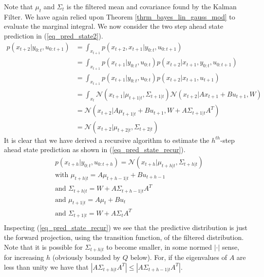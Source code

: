 Note that $\mu_t$ and $\Sigma_t$ is the filtered mean and covariance found by the Kalman Filter. We have again relied upon Theorem \ref{thrm_bayes_lin_gauss_mod} to evaluate the marginal integral. We now consider the two step ahead state prediction in (\ref{eq_pred_state2}).
\begin{equation}
\begin{aligned}
p(x_{t+2}|y_{0:t}, u_{0:t+1}) &= \int_{x_{t+1}} p(x_{t+2},x_{t+1}|y_{0:t}, u_{0:t+1}) \\
&= \int_{x_{t+1}} p(x_{t+1}|y_{0:t}, u_{0:t}) p(x_{t+2}|x_{t+1},y_{0:t}, u_{0:t+1}) \\
&= \int_{x_{t+1}} p(x_{t+1}|y_{0:t}, u_{0:t}) p(x_{t+2}|x_{t+1}, u_{t+1}) \\
&= \int_{x_t} \mathcal{N}(x_{t+1}|\mu_{t+1|t}, \Sigma_{t+1|t})\mathcal{N}(x_{t+2}|Ax_{t+1}+Bu_{t+1}, W) \\
&= \mathcal{N}(x_{t+2}|A\mu_{t+1|t}+Bu_{t+1}, W+A\Sigma_{t+1|t} A^T) \\
&= \mathcal{N}(x_{t+2}|\mu_{t+2|t}, \Sigma_{t+2|t})
\end{aligned}
\label{eq_pred_state2}
\end{equation}
It is clear that we have derived a recursive algorithm to estimate the $h^{th}$-step ahead state prediction as shown in (\ref{eq_pred_state_recur}).
\begin{equation}
\begin{aligned}
&p(x_{t+h}|y_{0:t}, u_{0:t+h}) = \mathcal{N}(x_{t+h}|\mu_{t+h|t}, \Sigma_{t+h|t}) \\
&\text{with } \mu_{t+h|t} = A\mu_{t+h-1|t}+Bu_{t+h-1} \\
&\text{and } \Sigma_{t+h|t} = W+A\Sigma_{t+h-1|t} A^T \\
&\text{and } \mu_{t+1|t} = A\mu_t+Bu_{t} \\
&\text{and } \Sigma_{t+1|t} = W+A\Sigma_t A^T \\ 
\end{aligned}
\label{eq_pred_state_recur}
\end{equation}
Inspecting (\ref{eq_pred_state_recur}) we see that the predictive distribution is just the forward projection, using the transition function, of the filtered distribution. Note that it is possible for $\Sigma_{t+h|t}$ to become smaller, in some normed $|\cdot|$ sense, for increasing $h$ (obviously bounded by $Q$ below). For, if the eigenvalues of $A$ are less than unity we have that $|A\Sigma_{t+h|t}A^T| \leq |A\Sigma_{t+h-1|t}A^T|$.


